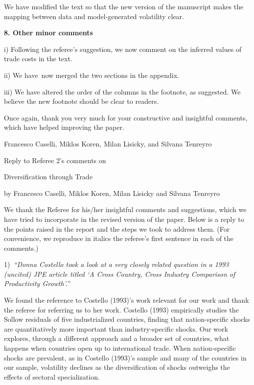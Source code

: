 \documentclass[12pt]{article}
\begin{document}
We have modified the text so that the new version of the manuscript makes
the mapping between data and model-generated volatility clear.

\bigskip

\textbf{8. Other minor comments}

i) Following the referee's suggestion, we now comment on the inferred values
of trade costs in the text.

ii) We have\ now merged the two sections in the appendix.

iii) We have altered the order of the columns in the footnote, as suggested.
We believe the new footnote should be clear to readers.\bigskip

Once again, thank you very much for your constructive and insightful
comments, which have helped improving the paper.\medskip \medskip \bigskip

Francesco Caselli, Miklos Koren, Milan Lisicky, and Silvana Tenreyro

\thispagestyle{plain}\pagebreak

\begin{center}
\thispagestyle{plain}\setcounter{page}{1}Reply to Referee 2's comments on

{\Large Diversification through Trade}

by Francesco Caselli, Miklos Koren, Milan Lisicky and Silvana
Tenreyro\medskip

\bigskip
\end{center}

We thank the Referee for his/her insightful comments and suggestions, which
we have tried to incorporate in the revised version of the paper. Below is a
reply to the points raised in the report and the steps we took to address
them. (For convenience, we reproduce in italics the referee's first sentence
in each of the comments.)\bigskip

1)\textit{\ \textquotedblleft Donna Costello took a look at a very closely
related question in a 1993 (uncited) JPE article titled `A Cross Country,
Cross Industry Comparison of Productivity Growth'.\textquotedblright }

We found the reference to Costello (1993)'s work relevant for our work and
thank the referee for referring us to her work. Costello (1993) empirically
studies the Sollow residuals of five industrialized countries, finding that
nation-specific shocks are quantitatively more important than
industry-specific shocks. Our work explores, through a different approach
and a broader set of countries, what happens when countries open up to
international trade. When nation-specific shocks are prevalent, as in
Costello (1993)'s sample and many of the countries in our sample, volatility
declines as the diversification of shocks outweighs the effects of sectoral
specialization.\bigskip
\end{document}
